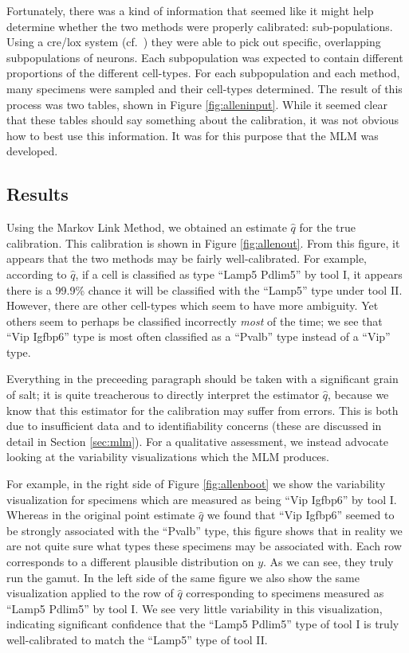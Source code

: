 Fortunately, there was a kind of information that seemed like it might help determine whether the two methods were properly calibrated: sub-populations.  Using a cre/lox system (cf.\ \citep{tasic2017shared}) they were able to pick out specific, overlapping subpopulations of neurons.  Each subpopulation was expected to contain different proportions of the different cell-types.  For each subpopulation and each method, many specimens were sampled and their cell-types determined.  The result of this process was two tables, shown in Figure \ref{fig:alleninput}.  While it seemed clear that these tables should say something about the calibration, it was not obvious how to best use this information.  It was for this purpose that the MLM was developed.

\subsection{Results}


Using the Markov Link Method, we obtained an estimate $\hat q$ for the true calibration.  This calibration is shown in Figure \ref{fig:allenout}.  From this figure, it appears that the two methods may be fairly well-calibrated.  For example, according to $\hat q$, if a cell is classified as type ``Lamp5 Pdlim5'' by tool I, it appears there is a 99.9\% chance it will be classified with the ``Lamp5'' type under tool II.  However, there are other cell-types which seem to have more ambiguity.  Yet others seem to perhaps be classified incorrectly \emph{most} of the time; we see that ``Vip Igfbp6'' type is most often classified as a ``Pvalb'' type instead of a ``Vip'' type.  

Everything in the preceeding paragraph should be taken with a significant grain of salt; it is quite treacherous to directly interpret the estimator $\hat q$, because we know that this estimator for the calibration may suffer from errors.  This is both due to insufficient data and to identifiability concerns (these are discussed in detail in Section \ref{sec:mlm}).  For a qualitative assessment, we instead advocate looking at the variability visualizations which the MLM produces.  

For example, in the right side of Figure \ref{fig:allenboot} we show the variability visualization for specimens which are measured as being ``Vip Igfbp6'' by tool I.  Whereas in the original point estimate $\hat q$ we found that ``Vip Igfbp6'' seemed to be strongly associated with the ``Pvalb'' type, this figure shows that in reality we are not quite sure what types these specimens may be associated with.   Each row corresponds to a different plausible distribution on $y$.  As we can see, they truly run the gamut.  In the left side of the same figure we also show the same visualization applied to the row of $\hat q$ corresponding to specimens measured as ``Lamp5 Pdlim5'' by tool I.  We see very little variability in this visualization, indicating significant confidence that the ``Lamp5 Pdlim5'' type of tool I is truly well-calibrated to match the ``Lamp5'' type of tool II.

